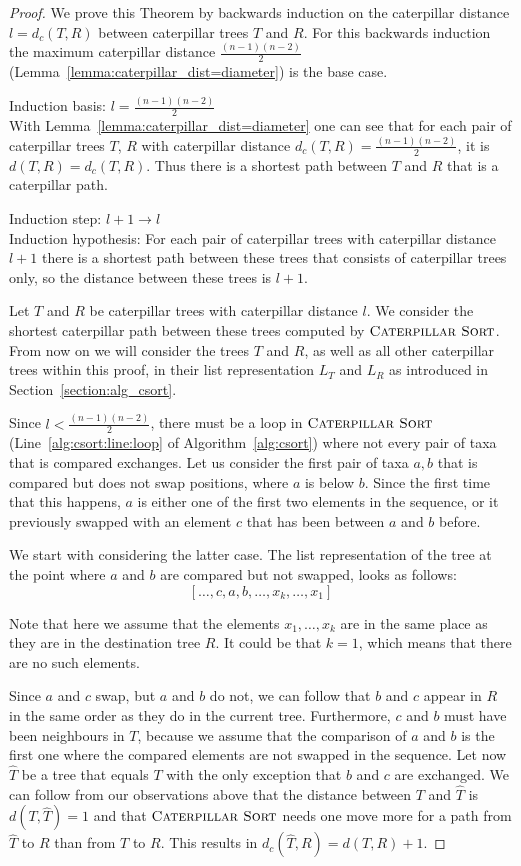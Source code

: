 \documentclass{amsart}
\newcommand{\csort}{\textsc{Caterpillar Sort}}
\begin{document}
\begin{proof}
We prove this Theorem by backwards induction on the caterpillar distance $l = d_c(T,R)$ between caterpillar trees $T$ and $R$.
For this backwards induction the maximum caterpillar distance $\frac{(n-1)(n-2)}{2}$ (Lemma~\ref{lemma:caterpillar_dist=diameter}) is the base case.

Induction basis: $l = \frac{(n-1)(n-2)}{2}$\\
With Lemma~\ref{lemma:caterpillar_dist=diameter} one can see that for each pair of caterpillar trees $T$, $R$ with caterpillar distance $d_c(T,R) = \frac{(n-1)(n-2)}{2}$, it is $d(T,R) = d_c(T,R)$.
Thus there is a shortest path between $T$ and $R$ that is a caterpillar path.

Induction step: $l+1 \to l$\\
Induction hypothesis: For each pair of caterpillar trees with caterpillar distance $l+1$ there is a shortest path between these trees that consists of caterpillar trees only, so the distance between these trees is $l+1$.

Let $T$ and $R$ be caterpillar trees with caterpillar distance $l$.
We consider the shortest caterpillar path between these trees computed by $\csort$.
From now on we will consider the trees $T$ and $R$, as well as all other caterpillar trees within this proof, in their list representation $L_T$ and $L_R$ as introduced in Section~\ref{section:alg_csort}.

Since $l < \frac{(n-1)(n-2)}{2}$, there must be a loop in $\csort$ (Line~\ref{alg:csort:line:loop} of Algorithm~\ref{alg:csort}) where not every pair of taxa that is compared exchanges.
Let us consider the first pair of taxa $a,b$ that is compared but does not swap positions, where $a$ is below $b$.
Since the first time that this happens, $a$ is either one of the first two elements in the sequence, or it previously swapped with an element $c$ that has been between $a$ and $b$ before.

We start with considering the latter case.
The list representation of the tree at the point where $a$ and $b$ are compared but not swapped, looks as follows:
\[[\ldots, c, a, b, \ldots, x_k, \ldots, x_1]\]

Note that here we assume that the elements $x_1, \ldots, x_k$ are in the same place as they are in the destination tree $R$.
It could be that $k=1$, which means that there are no such elements.

Since $a$ and $c$ swap, but $a$ and $b$ do not, we can follow that $b$ and $c$ appear in $R$ in the same order as they do in the current tree.
Furthermore, $c$ and $b$ must have been neighbours in $T$, because we assume that the comparison of $a$ and $b$ is the first one where the compared elements are not swapped in the sequence.
Let now $\hat T$ be a tree that equals $T$ with the only exception that $b$ and $c$ are exchanged.
We can follow from our observations above that the distance between $T$ and $\hat T$ is $d(T, \hat T) = 1$ and that $\csort$ needs one move more for a path from $\hat T$ to $R$ than from $T$ to $R$.
This results in $d_c(\hat T, R) = d(T,R) + 1$.


\end{proof}
\end{document}
